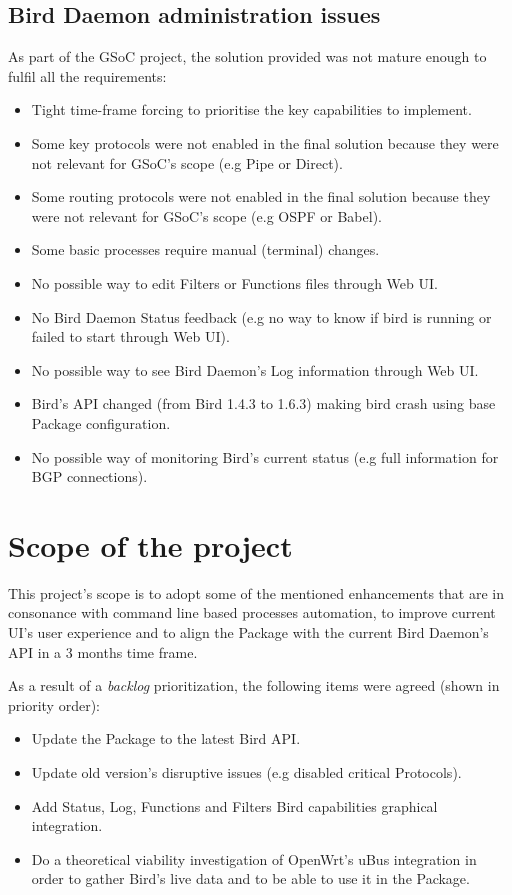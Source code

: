 \subsection{Bird Daemon administration issues}
\label{subsec:bdai}
As part of the GSoC project, the solution provided was not mature enough to fulfil all the requirements:
\begin{itemize}
    \item Tight time-frame forcing to prioritise the key capabilities to implement.
    \item Some key protocols were not enabled in the final solution because they were not relevant for GSoC's scope (e.g Pipe or Direct).
    \item Some routing protocols were not enabled in the final solution because they were not relevant for GSoC's scope (e.g OSPF or Babel).
    \item Some basic processes require manual (terminal) changes.
    \item No possible way to edit Filters or Functions files through Web UI.
    \item No Bird Daemon Status feedback (e.g no way to know if bird is running or failed to start through Web UI).
    \item No possible way to see Bird Daemon's Log information through Web UI.
    \item Bird's API changed (from Bird 1.4.3 to 1.6.3) making bird crash using base Package configuration.
    \item No possible way of monitoring Bird's current status (e.g full information for BGP connections).
\end{itemize}


\section{Scope of the project}
\label{sec:sotp}
This project's scope is to adopt some of the mentioned enhancements that are in consonance with command line based processes automation, to improve current UI's user experience and to align the Package with the current Bird Daemon's API in a 3 months time frame.

As a result of a \textit{backlog} prioritization, the following items were agreed (shown in priority order):
\begin{itemize}
    \item Update the Package to the latest Bird API.
    \item Update old version's disruptive issues (e.g disabled critical Protocols).
    \item Add Status, Log, Functions and Filters Bird capabilities graphical integration.
    \item Do a theoretical viability investigation of OpenWrt's uBus integration in order to gather Bird's live data and to be able to use it in the Package.
\end{itemize}


